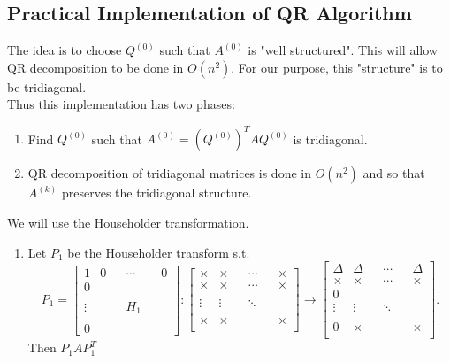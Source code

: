 \documentclass[../main/main.tex]{subfiles}
\begin{document}
\subsection{Practical Implementation of QR Algorithm}

		The idea is to choose $Q^{(0)}$ such that $A^{(0)}$ is {"well structured"}. This will allow QR decomposition to be done in $O(n^2)$. For our purpose, this "structure" is to be tridiagonal.\\
		
		Thus this implementation has two phases:
		\begin{enumerate}
			\item Find $Q^{(0)}$ such that $A^{(0)}=(Q^{(0)})^TAQ^{(0)}$ is tridiagonal.
			\item QR decomposition of tridiagonal matrices is done in $O(n^2)$ and so that $A^{(k)}$ preserves the tridiagonal structure.
		\end{enumerate}
		\begin{algo}[Phase 1]
	We will use the Householder transformation.\\
	\begin{enumerate}
		\item Let $P_1$ be the Householder transform s.t.\[
				P_1=\begin{bmatrix}1 &0&&\cdots&&0\\0&&&&&\\ &&&&&\\ \vdots&&&H_1&&\\ &&&&&\\0&&&&& \end{bmatrix} : \begin{bmatrix} 
				\times &\times & &\cdots &&\times  \\ 
				\times &\times&&\cdots&& \times \\
				&&&&&  \\
\vdots& \vdots&&\ddots&&\\
	  &&&&&\\
\times &\times&&&& \times \\
				\end{bmatrix}\to\begin{bmatrix} 
				\Delta&\Delta& &\cdots &&\Delta\\ 
				\times&\times&&\cdots&& \times \\
				0&&&&&  \\
\vdots& \vdots&&\ddots&&\\
	  &&&&&\\
0&\times&&&& \times \\
\end{bmatrix} 
		.\] Then $P_1AP_1^T$
	\end{enumerate}
\end{algo}
\end{document}
